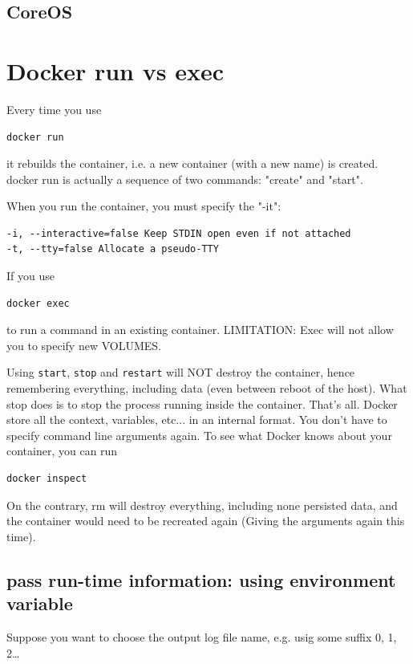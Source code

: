 \subsection{CoreOS}
\label{sec:CoreOS}

\section{Docker run vs exec}
\label{sec:Docker-run}

Every time you use
\begin{verbatim}
docker run
\end{verbatim}
it rebuilds the container, i.e. a new container (with a new name) is created.
docker run is actually a sequence of two commands: "create" and "start".


When you run the container, you must specify the "-it":
\begin{verbatim}
-i, --interactive=false Keep STDIN open even if not attached
-t, --tty=false Allocate a pseudo-TTY
\end{verbatim}

If you use
\begin{verbatim}
docker exec
\end{verbatim}
to run a command in an existing container. 
LIMITATION: Exec will not allow you to specify new VOLUMES.


Using \verb!start!, \verb!stop! and \verb!restart! will NOT destroy the
container, hence remembering everything, including data (even between reboot of
the host). What stop does is to stop the process running inside the container.
That's all. Docker store all the context, variables, etc... in an internal
format. You don't have to specify command line arguments again. To see what
Docker knows about your container, you can run 
\begin{verbatim}
docker inspect
\end{verbatim}

On the contrary, rm will destroy everything, including none persisted data, and
the container would need to be recreated again (Giving the arguments again this
time).

\subsection{pass run-time information: using environment variable}

Suppose you want to choose the output log file name, e.g. usig some suffix 0, 1, 2\ldots

